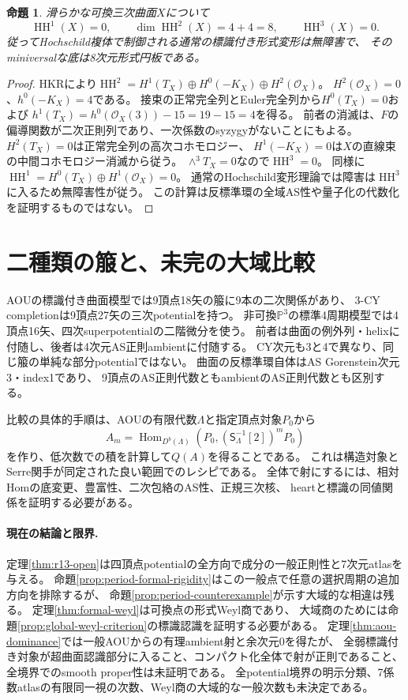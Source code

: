 \documentclass[11pt,a4paper]{ltjsarticle}
\newtheorem{proposition}[theorem]{命題}
\theoremstyle{definition}\newtheorem{remark}[theorem]{注意}
\newcommand{\PP}{\mathbb P}\newcommand{\kk}{\mathbb C}
\newcommand{\Hom}{\operatorname{Hom}}\newcommand{\HH}{\operatorname{HH}}
\newcommand{\OO}{\mathcal O}\newcommand{\rank}{\operatorname{rank}}
\begin{document}
\begin{proposition}\label{prop:hh}
滑らかな可換三次曲面$X$について
\[
 \HH^1(X)=0,\qquad \dim\HH^2(X)=4+4=8,\qquad \HH^3(X)=0.
\]
従ってHochschild複体で制御される通常の標識付き形式変形は無障害で、
そのminiversalな底は8次元形式円板である。
\end{proposition}
\begin{proof}
HKRにより$\HH^2=H^1(T_X)\oplus H^0(-K_X)\oplus H^2(\OO_X)$。
$H^2(\OO_X)=0$、$h^0(-K_X)=4$である。
接束の正常完全列とEuler完全列から$H^0(T_X)=0$および
$h^1(T_X)=h^0(\OO_X(3))-15=19-15=4$を得る。
前者の消滅は、$F$の偏導関数が二次正則列であり、一次係数のsyzygyがないことにもよる。
$H^2(T_X)=0$は正常完全列の高次コホモロジー、
$H^1(-K_X)=0$は$X$の直線束の中間コホモロジー消滅から従う。
$\wedge^3T_X=0$なので$\HH^3=0$。
同様に$\HH^1=H^0(T_X)\oplus H^1(\OO_X)=0$。
通常のHochschild変形理論では障害は$\HH^3$に入るため無障害性が従う。
この計算は反標準環の全域AS性や量子化の代数化を証明するものではない。
\end{proof}

\section{二種類の箙と、未完の大域比較}
AOUの標識付き曲面模型では9頂点18矢の箙に9本の二次関係があり、
3-CY completionは9頂点27矢の三次potentialを持つ。
非可換$\PP^3$の標準4周期模型では4頂点16矢、四次superpotentialの二階微分を使う。
前者は曲面の例外列・helixに付随し、後者は4次元AS正則ambientに付随する。
CY次元も3と4で異なり、同じ箙の単純な部分potentialではない。
曲面の反標準環自体はAS Gorenstein次元3・index1であり、
9頂点のAS正則代数ともambientのAS正則代数とも区別する。

比較の具体的手順は、AOUの有限代数$\Lambda$と指定頂点対象$P_0$から
\[
 A_m=\Hom_{D^b(\Lambda)}
       (P_0,(\mathsf S_\Lambda^{-1}[2])^m P_0)
\]
を作り、低次数での積を計算して$Q(A)$を得ることである。
これは構造対象とSerre関手が同定された良い範囲でのレシピである。
全体で射にするには、相対Homの底変更、豊富性、二次包絡のAS性、正規三次核、
heartと標識の同値関係を証明する必要がある。

\paragraph{現在の結論と限界.}
定理\ref{thm:r13-open}は四頂点potentialの全方向で成分の一般正則性と7次元atlasを与える。
命題\ref{prop:period-formal-rigidity}はこの一般点で任意の選択周期の追加方向を排除するが、
命題\ref{prop:period-counterexample}が示す大域的な相違は残る。
定理\ref{thm:formal-weyl}は可換点の形式Weyl商であり、
大域商のためには命題\ref{prop:global-weyl-criterion}の標識認識を証明する必要がある。
定理\ref{thm:aou-dominance}では一般AOUからの有理ambient射と余次元0を得たが、
全弱標識付き対象が超曲面認識部分に入ること、コンパクト化全体で射が正則であること、
全境界でのsmooth proper性は未証明である。
全potential境界の明示分類、7係数atlasの有限同一視の次数、Weyl商の大域的な一般次数も未決定である。
\end{document}
